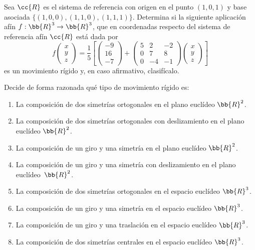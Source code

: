 \begin{ejercicio}
    Sea $\cc{R}$ es el sistema de referencia con origen en el punto $(1, 0, 1)$ y base asociada $\{(1, 0, 0),(1, 1, 0),(1, 1, 1)\}$. Determina si la siguiente aplicación afín $f : \bb{R}^3\to \bb{R}^3$, que en coordenadas respecto del sistema de referencia afín $\cc{R}$ está dada por
    \begin{equation*}
        f\left(\begin{array}{c}
            x \\ y \\ z
        \end{array}\right) = \frac{1}{5}
        \left[
        \left(\begin{array}{c}
            -9 \\ 16 \\ -7
        \end{array}\right) +
        \left(\begin{array}{ccc}
            5 & 2 & -2 \\
            0 & 7 & 8 \\
            0 & -4 & -1
        \end{array}\right)
        \left(\begin{array}{c}
            x \\ y \\ z
        \end{array}\right)
        \right]
    \end{equation*}
    es un movimiento rígido y, en caso afirmativo, clasifícalo.
\end{ejercicio}

\begin{ejercicio}
    Decide de forma razonada qué tipo de movimiento rígido es:
    \begin{enumerate}
        \item La composición de dos simetrías ortogonales en el plano euclídeo $\bb{R}^2$.
        \item La composición de dos simetrías ortogonales con deslizamiento en el plano euclídeo $\bb{R}^2$.
        \item La composición de un giro y una simetría en el plano euclídeo $\bb{R}^2$.
        \item La composición de un giro y una simetría con deslizamiento en el plano euclídeo~$\bb{R}^2$.
        \item La composición de dos simetrías ortogonales en el espacio euclídeo $\bb{R}^3$.
        \item La composición de un giro y una simetría en el espacio euclídeo $\bb{R}^3$.
        \item La composición de un giro y una traslación en el espacio euclídeo $\bb{R}^3$.
        \item La composición de dos simetrías centrales en el espacio euclídeo $\bb{R}^3$.
    \end{enumerate}
\end{ejercicio}

